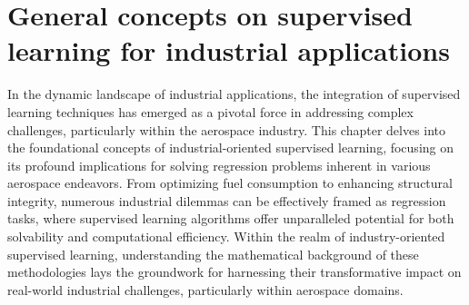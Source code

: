 \chapter{General concepts on supervised learning for industrial applications}\label{chap:3}
In the dynamic landscape of industrial applications, the integration of supervised learning techniques has emerged as a pivotal force in addressing complex challenges, particularly within the aerospace industry. This chapter delves into the foundational concepts of industrial-oriented supervised learning, focusing on its profound implications for solving regression problems inherent in various aerospace endeavors. From optimizing fuel consumption\cite{hong2018data} to enhancing structural integrity\cite{pfingstl2023warped}, numerous industrial dilemmas can be effectively framed as regression tasks, where supervised learning algorithms offer unparalleled potential for both solvability and computational efficiency. Within the realm of industry-oriented supervised learning, understanding the mathematical background of these methodologies lays the groundwork for harnessing their transformative impact on real-world industrial challenges, particularly within aerospace domains.\\
%
